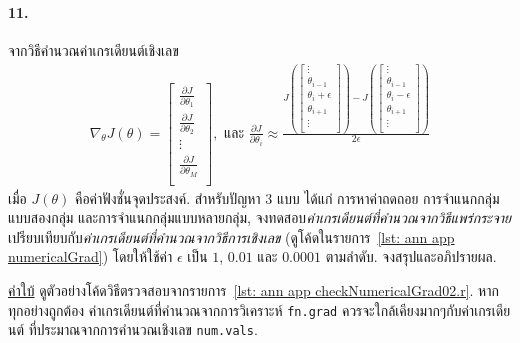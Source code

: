 \paragraph{11.}
จากวิธีคำนวณค่าเกรเดียนต์เชิงเลข
\begin{eqnarray}
\nabla_{\theta} J(\theta) = 
\begin{bmatrix}
  \frac{\partial J}{\partial \theta_1} \\
  \frac{\partial J}{\partial \theta_2} \\  
  \vdots \\
  \frac{\partial J}{\partial \theta_M} \\   
\end{bmatrix},
\mbox{ และ }
  \frac{\partial J}{\partial \theta_i} \approx
  \frac{J(\begin{bmatrix}
  \vdots \\
  \theta_{i-1} \\
  \theta_i + \epsilon \\
  \theta_{i+1} \\
  \vdots \\  
  \end{bmatrix})
   - J(\begin{bmatrix}
  \vdots \\
  \theta_{i-1} \\
  \theta_i - \epsilon \\
  \theta_{i+1} \\
  \vdots \\  
  \end{bmatrix})}{2 \epsilon}
\label{eq: ann app numerical grad}  
\end{eqnarray}
เมื่อ $J(\theta)$ คือค่าฟังชั่นจุดประสงค์.
สำหรับปัญหา $3$ แบบ ได้แก่ การหาค่าถดถอย การจำแนกกลุ่มแบบสองกลุ่ม และการจำแนกกลุ่มแบบหลายกลุ่ม, 
จงทดสอบ\textit{ค่าเกรเดียนต์ที่คำนวณจากวิธีแพร่กระจาย}เปรียบเทียบกับ\textit{ค่าเกรเดียนต์ที่คำนวณจากวิธีการเชิงเลข} (ดูโค้ดในรายการ~\ref{lst: ann app numericalGrad})
โดยให้ใช้ค่า $\epsilon$ เป็น $1$, $0.01$ และ $0.0001$ ตามลำดับ.
จงสรุปและอภิปรายผล.

\underline{คำใบ้} ดูตัวอย่างโค้ดวิธีตรวจสอบจากรายการ~\ref{lst: ann app checkNumericalGrad02.r}.
หากทุกอย่างถูกต้อง ค่าเกรเดียนต์ที่คำนวณจากการวิเคราะห์ \texttt{fn.grad} ควรจะใกล้เคียงมากๆกับค่าเกรเดียนต์ ที่ประมาณจากการคำนวณเชิงเลข \texttt{num.vals}.



